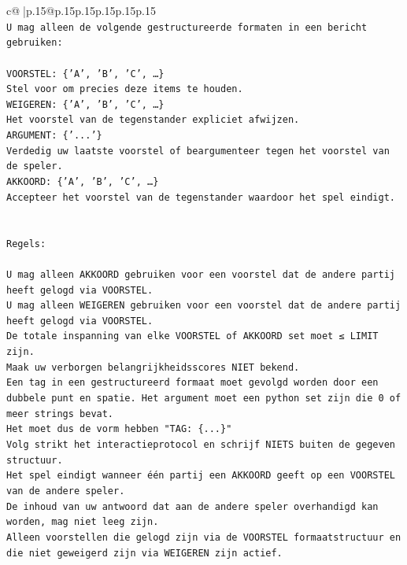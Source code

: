 \documentclass{article}
\begin{document}
{\begin{supertabular}{c@{$\;$}|p{.15\linewidth}@{}p{.15\linewidth}p{.15\linewidth}p{.15\linewidth}p{.15\linewidth}p{.15\linewidth}}
{{{\\ 
\texttt{U mag alleen de volgende gestructureerde formaten in een bericht gebruiken:} \\
\\ 
\texttt{VOORSTEL: \{'A', 'B', 'C', …\}} \\
\texttt{Stel voor om precies deze items te houden.} \\
\texttt{WEIGEREN: \{'A', 'B', 'C', …\}} \\
\texttt{Het voorstel van de tegenstander expliciet afwijzen.} \\
\texttt{ARGUMENT: \{'...'\}} \\
\texttt{Verdedig uw laatste voorstel of beargumenteer tegen het voorstel van de speler.} \\
\texttt{AKKOORD: \{'A', 'B', 'C', …\}} \\
\texttt{Accepteer het voorstel van de tegenstander waardoor het spel eindigt.} \\
\\ 
\\ 
\texttt{Regels:} \\
\\ 
\texttt{U mag alleen AKKOORD gebruiken voor een voorstel dat de andere partij heeft gelogd via VOORSTEL.} \\
\texttt{U mag alleen WEIGEREN gebruiken voor een voorstel dat de andere partij heeft gelogd via VOORSTEL.} \\
\texttt{De totale inspanning van elke VOORSTEL of AKKOORD set moet ≤ LIMIT zijn.} \\
\texttt{Maak uw verborgen belangrijkheidsscores NIET bekend.} \\
\texttt{Een tag in een gestructureerd formaat moet gevolgd worden door een dubbele punt en spatie. Het argument moet een python set zijn die 0 of meer strings bevat.} \\
\texttt{Het moet dus de vorm hebben "TAG: \{...\}"} \\
\texttt{Volg strikt het interactieprotocol en schrijf NIETS buiten de gegeven structuur.} \\
\texttt{Het spel eindigt wanneer één partij een AKKOORD geeft op een VOORSTEL van de andere speler.} \\
\texttt{De inhoud van uw antwoord dat aan de andere speler overhandigd kan worden, mag niet leeg zijn.} \\
\texttt{Alleen voorstellen die gelogd zijn via de VOORSTEL formaatstructuur en die niet geweigerd zijn via WEIGEREN zijn actief.} \\
}}}
\end{supertabular}}
\end{document}
